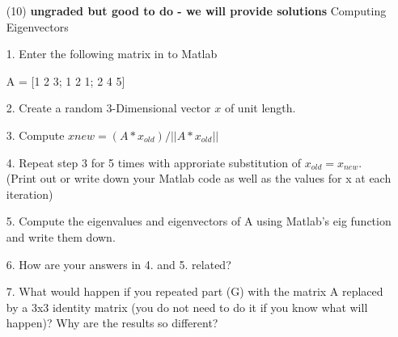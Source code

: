 \documentclass{article}
\begin{document}
\begin{itemize}
\item[(10)] {\bf ungraded but good to do - we will provide solutions} Computing Eigenvectors

1. Enter the following matrix in to Matlab

   A = [1 2 3; 1 2 1; 2 4 5]

2. Create a random 3-Dimensional vector $x$ of unit length.

3. Compute $x{new} = (A*x_{old})/||A*x_{old}||$  

4. Repeat step 3 for 5 times with approriate substitution of $x_{old} = x_{new}$.  
(Print out or write down your Matlab code as
well as the values for x at each iteration)  

5. Compute the eigenvalues and eigenvectors of A using Matlab's eig function and write them down.

6. How are your answers in 4. and 5. related? 

7. What would happen if you repeated part (G) with the matrix A replaced
by a 3x3 identity matrix (you do not need to do it if you know what
will happen)?   Why are the results so different? 

\end{itemize}
\end{document}
